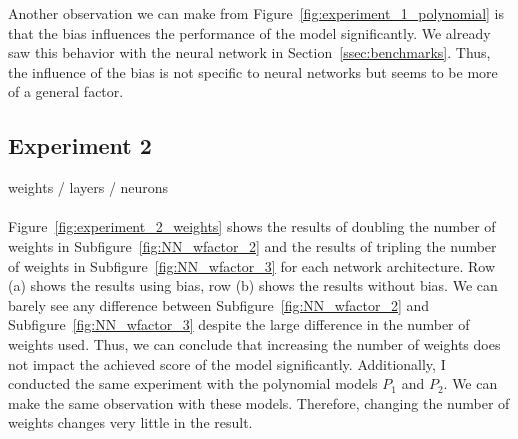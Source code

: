 Another observation we can make from Figure~\ref{fig:experiment_1_polynomial} is that the bias influences the performance of the model significantly. We already saw this behavior with the neural network in Section~\ref{ssec:benchmarks}. Thus, the influence of the bias is not specific to neural networks but seems to be more of a general factor.


\subsection{Experiment 2}
weights / layers / neurons \\ \\
Figure~\ref{fig:experiment_2_weights} shows the results of doubling the number of weights in Subfigure~\ref{fig:NN_wfactor_2} and the results of tripling the number of weights in Subfigure~\ref{fig:NN_wfactor_3} for each network architecture. Row (a) shows the results using bias, row (b) shows the results without bias. We can barely see any difference between Subfigure~\ref{fig:NN_wfactor_2} and Subfigure~\ref{fig:NN_wfactor_3} despite the large difference in the number of weights used. Thus, we can conclude that increasing the number of weights does not impact the achieved score of the model significantly. Additionally, I conducted the same experiment with the polynomial models $P_1$ and $P_2$. We can make the same observation with these models. Therefore, changing the number of weights changes very little in the result.
